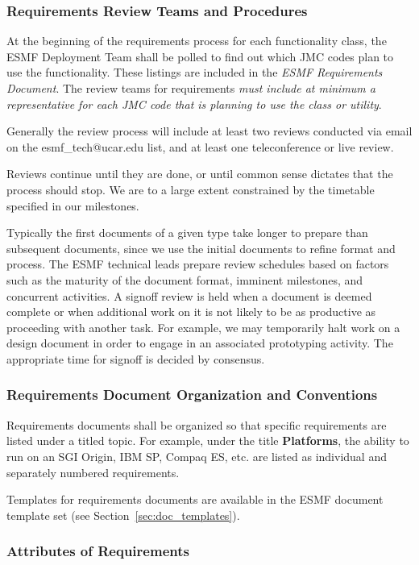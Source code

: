 \subsubsection{Requirements Review Teams and Procedures}

At the beginning of the requirements process for each functionality 
class, the ESMF Deployment Team shall be polled to find out which 
JMC codes plan to 
use the functionality.  These listings are included in the  
{\it ESMF Requirements Document}.  The review teams for requirements
{\it must include at minimum a representative for each JMC code that 
is planning to use the class or utility}.  

Generally the review process will include at least two reviews 
conducted via email on the esmf\_tech@ucar.edu list, and at least
one teleconference or live review.

Reviews continue until they are done, or until common sense dictates that
the process should stop.  We are to a large extent constrained by the 
timetable specified in our milestones.

Typically the first documents of a given type take longer to prepare than
subsequent documents, since we use the initial documents to refine format
and process.  The ESMF technical leads prepare review schedules based on
factors such as the maturity of the document format, imminent milestones,
and concurrent activities.  A signoff review is held when a document is
deemed complete or when additional work on it is not likely to be as 
productive as proceeding with another task.  For example,
we may temporarily halt work on a design document in order to 
engage in an associated prototyping activity.  
The appropriate time for signoff is decided by consensus.

\subsubsection{Requirements Document Organization and Conventions}

Requirements documents shall be organized so that specific requirements are
listed under a titled topic.  For example, under the title {\bf Platforms}, 
the ability to run on an SGI Origin, IBM SP, Compaq ES, etc. are 
listed as individual and separately numbered requirements.   

Templates for requirements documents are available in the ESMF document
template set (see Section~\ref{sec:doc_templates}).

\subsubsection{Attributes of Requirements}

